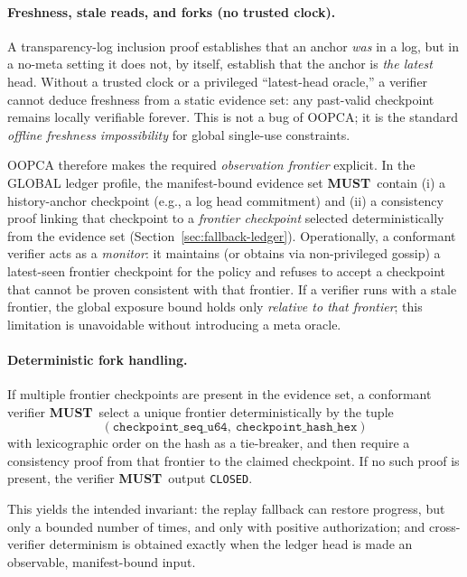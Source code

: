 \documentclass[11pt]{article}
\newcommand{\MUST}{\textbf{MUST}}
\begin{document}
\paragraph{Freshness, stale reads, and forks (no trusted clock).}
A transparency-log inclusion proof establishes that an anchor \emph{was} in a log, but in a no-meta setting it does not, by itself, establish that the anchor is \emph{the latest} head.
Without a trusted clock or a privileged ``latest-head oracle,'' a verifier cannot deduce freshness from a static evidence set: any past-valid checkpoint remains locally verifiable forever.
This is not a bug of OOPCA; it is the standard \emph{offline freshness impossibility} for global single-use constraints.

OOPCA therefore makes the required \emph{observation frontier} explicit.
In the GLOBAL ledger profile, the manifest-bound evidence set \MUST\ contain (i) a history-anchor checkpoint (e.g., a log head commitment) and (ii) a consistency proof linking that checkpoint to a \emph{frontier checkpoint} selected deterministically from the evidence set (Section~\ref{sec:fallback-ledger}).
Operationally, a conformant verifier acts as a \emph{monitor}: it maintains (or obtains via non-privileged gossip) a latest-seen frontier checkpoint for the policy and refuses to accept a checkpoint that cannot be proven consistent with that frontier.
If a verifier runs with a stale frontier, the global exposure bound holds only \emph{relative to that frontier}; this limitation is unavoidable without introducing a meta oracle.

\paragraph{Deterministic fork handling.}
If multiple frontier checkpoints are present in the evidence set, a conformant verifier \MUST\ select a unique frontier deterministically by the tuple
\[
(\texttt{checkpoint\_seq\_u64},\ \texttt{checkpoint\_hash\_hex})
\]
with lexicographic order on the hash as a tie-breaker, and then require a consistency proof from that frontier to the claimed checkpoint.
If no such proof is present, the verifier \MUST\ output \texttt{CLOSED}.

This yields the intended invariant: the replay fallback can restore progress, but only a bounded number of times, and only with positive authorization; and cross-verifier determinism is obtained exactly when the ledger head is made an observable, manifest-bound input.
\end{document}
